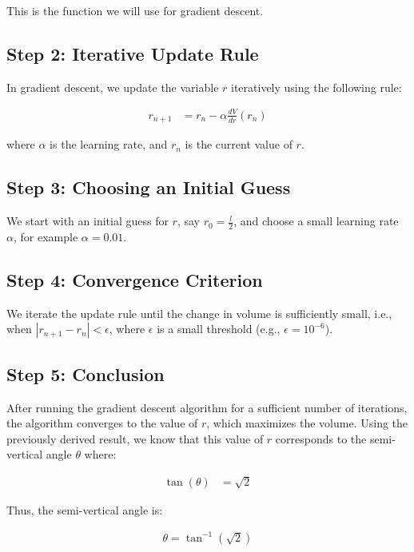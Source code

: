 \documentclass[journal]{IEEEtran}
\begin{document}
This is the function we will use for gradient descent.

\subsection*{Step 2: Iterative Update Rule}

In gradient descent, we update the variable \( r \) iteratively using the following rule:

\begin{align}
r_{n+1} &= r_n - \alpha \frac{dV}{dr}(r_n)
\end{align}

where \( \alpha \) is the learning rate, and \( r_n \) is the current value of \( r \).

\subsection*{Step 3: Choosing an Initial Guess}

We start with an initial guess for \( r \), say \( r_0 = \frac{l}{2} \), and choose a small learning rate \( \alpha \), for example \( \alpha = 0.01 \).

\subsection*{Step 4: Convergence Criterion}

We iterate the update rule until the change in volume is sufficiently small, i.e., when \( \left| r_{n+1} - r_n \right| < \epsilon \), where \( \epsilon \) is a small threshold (e.g., \( \epsilon = 10^{-6} \)).

\subsection*{Step 5: Conclusion}

After running the gradient descent algorithm for a sufficient number of iterations, the algorithm converges to the value of \( r \), which maximizes the volume. Using the previously derived result, we know that this value of \( r \) corresponds to the semi-vertical angle \( \theta \) where:

\begin{align}
\tan(\theta) &= \sqrt{2}
\end{align}

Thus, the semi-vertical angle is:

\begin{align}
\boxed{\theta = \tan^{-1}(\sqrt{2})}
\end{align}
\end{document}
